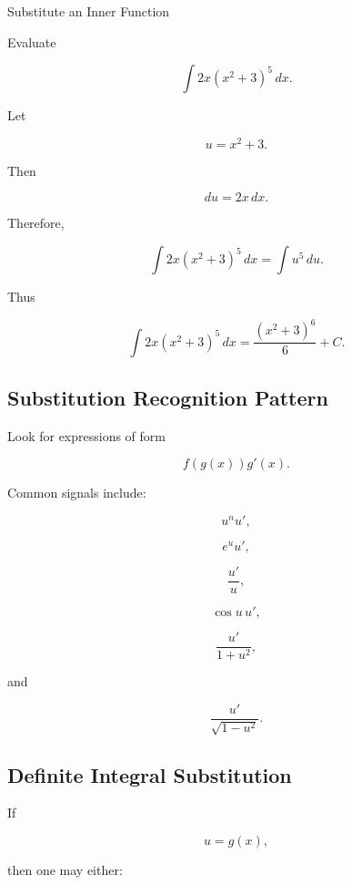 \begin{workedexamplebox}{Substitute an Inner Function}

Evaluate

\[
\int
2x(x^2+3)^5
\,dx.
\]

Let

\[
u=x^2+3.
\]

Then

\[
du=2x\,dx.
\]

Therefore,

\[
\int
2x(x^2+3)^5
\,dx
=
\int u^5\,du.
\]

Thus

\begin{answerbox}
\[
\boxed{
\int
2x(x^2+3)^5
\,dx
=
\frac{
(x^2+3)^6
}{
6
}
+
C.
}
\]
\end{answerbox}

\end{workedexamplebox}

\subsection{Substitution Recognition Pattern}
\label{subsec:substitution-recognition-pattern}

Look for expressions of form

\[
\boxed{
f(g(x))g'(x).
}
\]

Common signals include:

\[
\boxed{
u^n u',
}
\]

\[
\boxed{
e^u u',
}
\]

\[
\boxed{
\frac{u'}{u},
}
\]

\[
\boxed{
\cos u\,u',
}
\]

\[
\boxed{
\frac{u'}{1+u^2},
}
\]

and

\[
\boxed{
\frac{u'}{\sqrt{1-u^2}}.
}
\]

\subsection{Definite Integral Substitution}
\label{subsec:definite-substitution-reference}

If

\[
u=g(x),
\]

then one may either:

